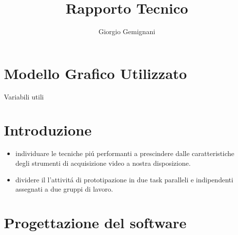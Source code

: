 \documentclass[10pt]{llncs}
\begin{document}
\mainmatter  %

\title{Rapporto Tecnico}


\author{Giorgio Gemignani}%

%


\maketitle








\section{Modello Grafico Utilizzato}
Variabili utili

\newpage
\section{Introduzione}

\begin{itemize}
\item individuare le tecniche pi\'u performanti a prescindere dalle caratteristiche degli strumenti di acquisizione video a nostra disposizione.
\item dividere il l'attivit\'a di prototipazione in due task paralleli e indipendenti assegnati a due gruppi di lavoro. 
\end{itemize}



\newpage


\section{ Progettazione del software}
\end{document}

